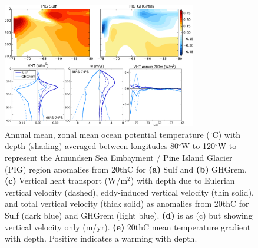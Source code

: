 \documentclass[grl]{AGUTeX}  %
\begin{document}
\begin{article}
\begin{figure}[htbp] %
\centering
 \noindent\includegraphics[width=20pc]{figures/TEMPanomvertheat_justPIG.pdf}
\caption{Annual mean, zonal mean ocean potential temperature ($^\circ$C) with depth (shading) averaged between longitudes 80$^\circ$W to 120$^\circ$W to represent the Amundsen Sea Embayment / Pine Island Glacier (PIG) region anomalies from 20thC for \textbf{(a)} Sulf and \textbf{(b)} GHGrem. \textbf{(c)} Vertical heat transport (W/m$^2$) with depth due to Eulerian vertical velocity (dashed), eddy-induced vertical velocity (thin solid), and total vertical velocity (thick solid) as anomalies from 20thC for Sulf (dark blue) and GHGrem (light blue). \textbf{(d)} is as (c) but showing vertical velocity only (m/yr). \textbf{(e)} 20thC mean temperature gradient with depth. Positive indicates a warming with depth.}
\label{fig:pigtemp}
\end{figure}




\end{article}
\end{document}
